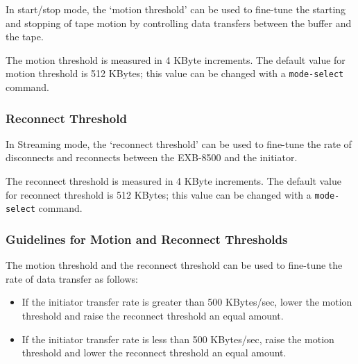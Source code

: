 In start/stop mode, the `motion threshold' can be used to fine-tune the
starting and stopping of tape motion by controlling data transfers between
the buffer and the tape.

The motion threshold is measured in 4 KByte increments. The default value
for motion threshold is 512 KBytes; this value can be changed with a
{\tt mode-select} command.

\subsubsection {Reconnect Threshold}

In Streaming mode, the `reconnect threshold' can be used to fine-tune the
rate of disconnects and reconnects between the EXB-8500 and the initiator.

The reconnect threshold is measured in 4 KByte increments. The default
value for reconnect threshold is 512 KBytes; this value can be changed with
a {\tt mode-select} command.

\subsubsection {Guidelines for Motion and Reconnect Thresholds}

The motion threshold and the reconnect threshold can be used to fine-tune
the rate of data transfer as follows:

\begin {itemize}

\item If the initiator transfer rate is greater than 500 KBytes/sec, lower
the motion threshold and raise the reconnect threshold an equal amount.

\item If the initiator transfer rate is less than 500 KBytes/sec, raise the
motion threshold and lower the reconnect threshold an equal amount.

\end {itemize}


